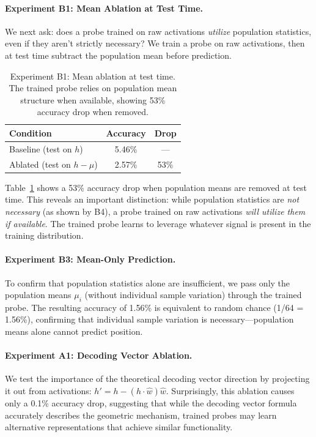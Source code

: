 \documentclass[11pt]{article}
\begin{document}
\paragraph{Experiment B1: Mean Ablation at Test Time.}
We next ask: does a probe trained on raw activations \textit{utilize} population statistics, even if they aren't strictly necessary? We train a probe on raw activations, then at test time subtract the population mean before prediction.

\begin{table}[htbp]
\centering
\small
\begin{tabular}{lcc}
\toprule
\textbf{Condition} & \textbf{Accuracy} & \textbf{Drop} \\
\midrule
Baseline (test on $h$) & 5.46\% & --- \\
Ablated (test on $h - \mu$) & 2.57\% & 53\% \\
\bottomrule
\end{tabular}
\caption{Experiment B1: Mean ablation at test time. The trained probe relies on population mean structure when available, showing 53\% accuracy drop when removed.}
\label{tab:b1-results}
\end{table}

Table~\ref{tab:b1-results} shows a 53\% accuracy drop when population means are removed at test time. This reveals an important distinction: while population statistics are \textit{not necessary} (as shown by B4), a probe trained on raw activations \textit{will utilize them if available}. The trained probe learns to leverage whatever signal is present in the training distribution.

\paragraph{Experiment B3: Mean-Only Prediction.}
To confirm that population statistics alone are insufficient, we pass only the population means $\mu_i$ (without individual sample variation) through the trained probe. The resulting accuracy of 1.56\% is equivalent to random chance (1/64 = 1.56\%), confirming that individual sample variation is necessary---population means alone cannot predict position.

\paragraph{Experiment A1: Decoding Vector Ablation.}
We test the importance of the theoretical decoding vector direction by projecting it out from activations: $h' = h - (h \cdot \hat{w})\hat{w}$. Surprisingly, this ablation causes only a 0.1\% accuracy drop, suggesting that while the decoding vector formula accurately describes the geometric mechanism, trained probes may learn alternative representations that achieve similar functionality.
\end{document}
